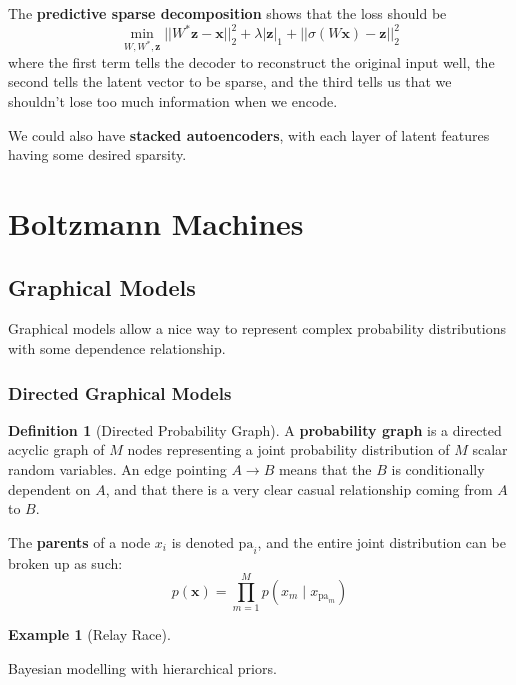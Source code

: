 \documentclass{article}
\theoremstyle{definition}
\newtheorem{example}{Example}[section]
\theoremstyle{remark}
\theoremstyle{definition}
\newtheorem{definition}{Definition}[section]
\begin{document}
  The \textbf{predictive sparse decomposition} shows that the loss should be 
  \[\min_{W, W^\ast, \mathbf{z}} ||W^\ast \mathbf{z} - \mathbf{x}||^2_2 + \lambda | \mathbf{z}|_1 + ||\sigma(W \mathbf{x}) - \mathbf{z}||^2_2\]
  where the first term tells the decoder to reconstruct the original input well, the second tells the latent vector to be sparse, and the third tells us that we shouldn't lose too much information when we encode. 

  We could also have \textbf{stacked autoencoders}, with each layer of latent features having some desired sparsity. 

\section{Boltzmann Machines} 

  \subsection{Graphical Models}
    Graphical models allow a nice way to represent complex probability distributions with some dependence relationship. 

    \subsubsection{Directed Graphical Models}

      \begin{definition}[Directed Probability Graph]  
      A \textbf{probability graph} is a directed acyclic graph of $M$ nodes representing a joint probability distribution of $M$ scalar random variables. An edge pointing $A \rightarrow B$ means that the $B$ is conditionally dependent on $A$, and that there is a very clear casual relationship coming from $A$ to $B$. 
      \begin{center}

      \end{center}
      The \textbf{parents} of a node $x_i$ is denoted $\mathrm{pa}_i$, and the entire joint distribution can be broken up as such: 
      \[p(\mathbf{x}) = \prod_{m=1}^M p(x_m \mid x_{\mathrm{pa}_m})\]
      \end{definition}


      \begin{example}[Relay Race]

      \end{example} 


      Bayesian modelling with hierarchical priors. 
\end{document}
